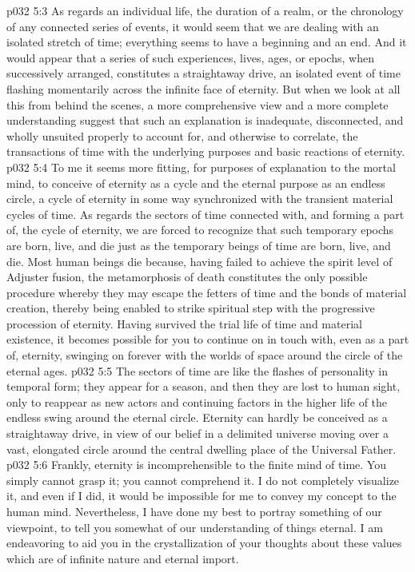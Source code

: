 \pc \vs p032 5:3 As regards an individual life, the duration of a realm, or the chronology of any connected series of events, it would seem that we are dealing with an isolated stretch of time; everything seems to have a beginning and an end. And it would appear that a series of such experiences, lives, ages, or epochs, when successively arranged, constitutes a straightaway drive, an isolated event of time flashing momentarily across the infinite face of eternity. But when we look at all this from behind the scenes, a more comprehensive view and a more complete understanding suggest that such an explanation is inadequate, disconnected, and wholly unsuited properly to account for, and otherwise to correlate, the transactions of time with the underlying purposes and basic reactions of eternity.
\vs p032 5:4 To me it seems more fitting, for purposes of explanation to the mortal mind, to conceive of eternity as a cycle and the eternal purpose as an endless circle, a cycle of eternity in some way synchronized with the transient material cycles of time. As regards the sectors of time connected with, and forming a part of, the cycle of eternity, we are forced to recognize that such temporary epochs are born, live, and die just as the temporary beings of time are born, live, and die. Most human beings die because, having failed to achieve the spirit level of Adjuster fusion, the metamorphosis of death constitutes the only possible procedure whereby they may escape the fetters of time and the bonds of material creation, thereby being enabled to strike spiritual step with the progressive procession of eternity. Having survived the trial life of time and material existence, it becomes possible for you to continue on in touch with, even as a part of, eternity, swinging on forever with the worlds of space around the circle of the eternal ages.
\vs p032 5:5 The sectors of time are like the flashes of personality in temporal form; they appear for a season, and then they are lost to human sight, only to reappear as new actors and continuing factors in the higher life of the endless swing around the eternal circle. Eternity can hardly be conceived as a straightaway drive, in view of our belief in a delimited universe moving over a vast, elongated circle around the central dwelling place of the Universal Father.
\vs p032 5:6 Frankly, eternity is incomprehensible to the finite mind of time. You simply cannot grasp it; you cannot comprehend it. I do not completely visualize it, and even if I did, it would be impossible for me to convey my concept to the human mind. Nevertheless, I have done my best to portray something of our viewpoint, to tell you somewhat of our understanding of things eternal. I am endeavoring to aid you in the crystallization of your thoughts about these values which are of infinite nature and eternal import.
